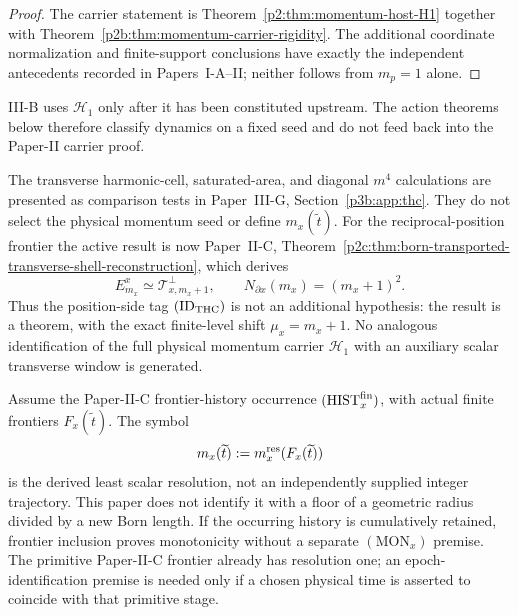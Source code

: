 \documentclass[12pt,a4paper]{article}
\begin{document}
\begin{proof}
The carrier statement is Theorem~\ref{p2:thm:momentum-host-H1} together with
Theorem~\ref{p2b:thm:momentum-carrier-rigidity}.  The additional coordinate
normalization and finite-support conclusions have exactly the independent
antecedents recorded in Papers~I-A--II; neither follows from \(m_p=1\) alone.
\end{proof}

\begin{remark}
\label{p3:rem:no-circular-use-finite-cell}
III-B uses \(\mathcal H_1\) only after it has been constituted upstream.  The
action theorems below therefore classify dynamics on a fixed seed and do not
feed back into the Paper-II carrier proof.
\end{remark}

\begin{remark}
The transverse harmonic-cell, saturated-area, and diagonal \(m^4\)
calculations are presented as comparison tests in Paper~III-G,
Section~\ref{p3b:app:thc}.  They do not select the physical momentum seed or define
\(m_x(\widetilde t)\).  For the reciprocal-position frontier the active result
is now Paper~II-C,
Theorem~\ref{p2c:thm:born-transported-transverse-shell-reconstruction}, which
derives
\[
 E_{m_x}^x\simeq\mathcal T_{x,m_x+1}^{\perp},
 \qquad N_{\partial x}(m_x)=(m_x+1)^2.
\]
Thus the position-side tag \((\mathrm{ID}_{\rm THC})\) is not an
additional hypothesis: the result is a theorem, with the exact finite-level shift \(\mu_x=m_x+1\).  No analogous
identification of the full physical momentum carrier \(\mathcal H_1\) with an
auxiliary scalar transverse window is generated.
\end{remark}

\begin{definition}
\label{p3:def:position-unfolding-level}
Assume the Paper-II-C frontier-history occurrence
\((\mathrm{HIST}_x^{\rm fin})\), with actual finite frontiers
\(F_x(\widetilde t)\).  The symbol
\[
 m_x(\widetilde t)
 :=m_x^{\rm res}(F_x(\widetilde t))
\]
is the derived least scalar resolution, not an independently supplied integer
trajectory.  This paper does not identify it with a floor of a geometric
radius divided by a new Born length.  If the occurring history is cumulatively
retained, frontier inclusion proves monotonicity without a separate
\((\mathrm{MON}_x)\) premise.  The primitive Paper-II-C frontier already has
resolution one; an epoch-identification premise is needed only if a chosen
physical time is asserted to coincide with that primitive stage.
\end{definition}
\end{document}
